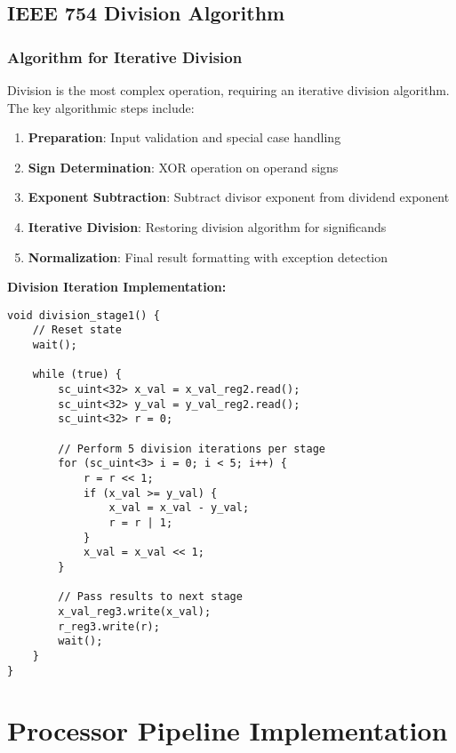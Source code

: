 \subsection{IEEE 754 Division Algorithm}
\label{subsec:ieee754_division}

\subsubsection{Algorithm for Iterative Division}

Division is the most complex operation, requiring an iterative division algorithm. The key algorithmic steps include:

\begin{enumerate}
    \item \textbf{Preparation}: Input validation and special case handling
    \item \textbf{Sign Determination}: XOR operation on operand signs
    \item \textbf{Exponent Subtraction}: Subtract divisor exponent from dividend exponent
    \item \textbf{Iterative Division}: Restoring division algorithm for significands
    \item \textbf{Normalization}: Final result formatting with exception detection
\end{enumerate}

\textbf{Division Iteration Implementation:}
\begin{lstlisting}[caption=Division Iteration Stage]
void division_stage1() {
    // Reset state
    wait();
    
    while (true) {
        sc_uint<32> x_val = x_val_reg2.read();
        sc_uint<32> y_val = y_val_reg2.read();
        sc_uint<32> r = 0;

        // Perform 5 division iterations per stage
        for (sc_uint<3> i = 0; i < 5; i++) {
            r = r << 1;
            if (x_val >= y_val) {
                x_val = x_val - y_val;
                r = r | 1;
            }
            x_val = x_val << 1;
        }

        // Pass results to next stage
        x_val_reg3.write(x_val);
        r_reg3.write(r);
        wait();
    }
}
\end{lstlisting}



\section{Processor Pipeline Implementation}
\label{sec:processor_pipeline}

